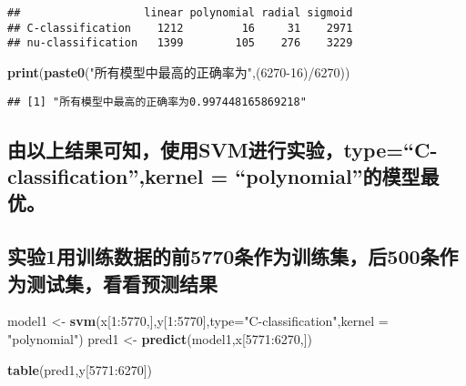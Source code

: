 \documentclass[]{article}
\newenvironment{Shaded}{\begin{snugshade}}{\end{snugshade}}
\newcommand{\KeywordTok}[1]{\textcolor[rgb]{0.13,0.29,0.53}{\textbf{{#1}}}}
\newcommand{\DataTypeTok}[1]{\textcolor[rgb]{0.13,0.29,0.53}{{#1}}}
\newcommand{\DecValTok}[1]{\textcolor[rgb]{0.00,0.00,0.81}{{#1}}}
\newcommand{\StringTok}[1]{\textcolor[rgb]{0.31,0.60,0.02}{{#1}}}
\newcommand{\NormalTok}[1]{{#1}}
\begin{document}
\begin{verbatim}
##                   linear polynomial radial sigmoid
## C-classification    1212         16     31    2971
## nu-classification   1399        105    276    3229
\end{verbatim}

\begin{Shaded}
\begin{Highlighting}[]
\KeywordTok{print}\NormalTok{(}\KeywordTok{paste0}\NormalTok{(}\StringTok{"所有模型中最高的正确率为"}\NormalTok{,(}\DecValTok{6270-16}\NormalTok{)/}\DecValTok{6270}\NormalTok{))}
\end{Highlighting}
\end{Shaded}

\begin{verbatim}
## [1] "所有模型中最高的正确率为0.997448165869218"
\end{verbatim}

\subsection{\texorpdfstring{由以上结果可知，使用SVM进行实验，type=``C-classification'',kernel
=
``polynomial''的模型最优。}{由以上结果可知，使用SVM进行实验，type=C-classification,kernel = polynomial的模型最优。}}\label{svmtypec-classificationkernel-polynomial}

\subsection{实验1用训练数据的前5770条作为训练集，后500条作为测试集，看看预测结果}\label{15770500}

\begin{Shaded}
\begin{Highlighting}[]
\NormalTok{model1 <-}\StringTok{ }\KeywordTok{svm}\NormalTok{(x[}\DecValTok{1}\NormalTok{:}\DecValTok{5770}\NormalTok{,],y[}\DecValTok{1}\NormalTok{:}\DecValTok{5770}\NormalTok{],}\DataTypeTok{type=}\StringTok{"C-classification"}\NormalTok{,}\DataTypeTok{kernel =} \StringTok{"polynomial"}\NormalTok{)}
\NormalTok{pred1 <-}\StringTok{ }\KeywordTok{predict}\NormalTok{(model1,x[}\DecValTok{5771}\NormalTok{:}\DecValTok{6270}\NormalTok{,])}
\end{Highlighting}
\end{Shaded}

\begin{Shaded}
\begin{Highlighting}[]
\KeywordTok{table}\NormalTok{(pred1,y[}\DecValTok{5771}\NormalTok{:}\DecValTok{6270}\NormalTok{])}
\end{Highlighting}
\end{Shaded}
\end{document}
